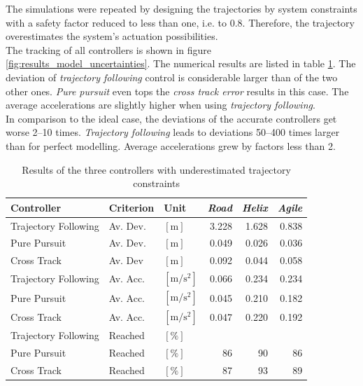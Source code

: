 The simulations were repeated by designing the trajectories by system constraints with a safety factor reduced to less than one, i.e. to \num{0.8}. Therefore, the trajectory overestimates the system's actuation possibilities. \\
The tracking of all controllers is shown in figure \ref{fig:results_model_uncertainties}. The numerical results are listed in table \ref{tab:results_model_uncertainties}. The deviation of \textit{trajectory following} control is considerable larger than of the two other ones. \textit{Pure pursuit} even tops the \textit{cross track error} results in this case. The average accelerations are slightly higher when using \textit{trajectory following}.
\\
In comparison to the ideal case, the deviations of the accurate controllers get worse \numrange{2}{10} times. \textit{Trajectory following} leads to deviations \numrange{50}{400} times larger than for perfect modelling. Average accelerations grew by factors less than \num{2}.

\begin{table}[H]
\begin{center}
 \begin{tabular}{lll|rrr}
 \hline
 Controller & Criterion & Unit & \textit{Road} & \textit{Helix} & \textit{Agile} \\ \hline \hline
 Trajectory Following & Av. Dev. & $[\si{\meter}]$ & 3.228 & 1.628 & 0.838 \\
 Pure Pursuit         & Av. Dev. & $[\si{\meter}]$ & 0.049 & 0.026 & 0.036 \\
 Cross Track          & Av. Dev & $[\si{\meter}]$ &  0.092 & 0.044 & 0.058 \\
    
 Trajectory Following & Av. Acc. & $[\si{\meter\per\square\second}]$ & 0.066 & 0.234 & 0.234 \\
 Pure Pursuit         & Av. Acc. & $[\si{\meter\per\square\second}]$ & 0.045 & 0.210 & 0.182 \\
 Cross Track          & Av. Acc. & $[\si{\meter\per\square\second}]$ & 0.047 & 0.220 & 0.192 \\
 
 Trajectory Following & Reached & $[\si{\percent}]$ & \ktilde100 & \ktilde90 & \ktilde100 \\
 Pure Pursuit         & Reached & $[\si{\percent}]$ &  86 &  90 &  86 \\
 Cross Track          & Reached & $[\si{\percent}]$ &  87 &  93 &  89 \\
 \hline
 \end{tabular}
 \caption{Results of the three controllers with underestimated trajectory constraints}\vspace{1px}
 \label{tab:results_model_uncertainties}
\end{center}
\end{table}

